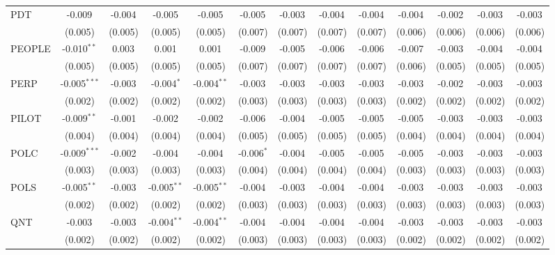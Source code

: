 \begin{table}[!htbp]
\begin{tabular}{@{\extracolsep{5pt}}lcccccccccccc}
 PDT & -0.009$^{}$ & -0.004$^{}$ & -0.005$^{}$ & -0.005$^{}$ & -0.005$^{}$ & -0.003$^{}$ & -0.004$^{}$ & -0.004$^{}$ & -0.004$^{}$ & -0.002$^{}$ & -0.003$^{}$ & -0.003$^{}$ \\
  & (0.005) & (0.005) & (0.005) & (0.005) & (0.007) & (0.007) & (0.007) & (0.007) & (0.006) & (0.006) & (0.006) & (0.006) \\
 PEOPLE & -0.010$^{**}$ & 0.003$^{}$ & 0.001$^{}$ & 0.001$^{}$ & -0.009$^{}$ & -0.005$^{}$ & -0.006$^{}$ & -0.006$^{}$ & -0.007$^{}$ & -0.003$^{}$ & -0.004$^{}$ & -0.004$^{}$ \\
  & (0.005) & (0.005) & (0.005) & (0.005) & (0.007) & (0.007) & (0.007) & (0.007) & (0.006) & (0.005) & (0.005) & (0.005) \\
 PERP & -0.005$^{***}$ & -0.003$^{}$ & -0.004$^{*}$ & -0.004$^{**}$ & -0.003$^{}$ & -0.003$^{}$ & -0.003$^{}$ & -0.003$^{}$ & -0.003$^{}$ & -0.002$^{}$ & -0.003$^{}$ & -0.003$^{}$ \\
  & (0.002) & (0.002) & (0.002) & (0.002) & (0.003) & (0.003) & (0.003) & (0.003) & (0.002) & (0.002) & (0.002) & (0.002) \\
 PILOT & -0.009$^{**}$ & -0.001$^{}$ & -0.002$^{}$ & -0.002$^{}$ & -0.006$^{}$ & -0.004$^{}$ & -0.005$^{}$ & -0.005$^{}$ & -0.005$^{}$ & -0.003$^{}$ & -0.003$^{}$ & -0.003$^{}$ \\
  & (0.004) & (0.004) & (0.004) & (0.004) & (0.005) & (0.005) & (0.005) & (0.005) & (0.004) & (0.004) & (0.004) & (0.004) \\
 POLC & -0.009$^{***}$ & -0.002$^{}$ & -0.004$^{}$ & -0.004$^{}$ & -0.006$^{*}$ & -0.004$^{}$ & -0.005$^{}$ & -0.005$^{}$ & -0.005$^{}$ & -0.003$^{}$ & -0.003$^{}$ & -0.003$^{}$ \\
  & (0.003) & (0.003) & (0.003) & (0.003) & (0.004) & (0.004) & (0.004) & (0.004) & (0.003) & (0.003) & (0.003) & (0.003) \\
 POLS & -0.005$^{**}$ & -0.003$^{}$ & -0.005$^{**}$ & -0.005$^{**}$ & -0.004$^{}$ & -0.003$^{}$ & -0.004$^{}$ & -0.004$^{}$ & -0.003$^{}$ & -0.003$^{}$ & -0.003$^{}$ & -0.003$^{}$ \\
  & (0.002) & (0.002) & (0.002) & (0.002) & (0.003) & (0.003) & (0.003) & (0.003) & (0.003) & (0.003) & (0.003) & (0.003) \\
 QNT & -0.003$^{}$ & -0.003$^{}$ & -0.004$^{**}$ & -0.004$^{**}$ & -0.004$^{}$ & -0.004$^{}$ & -0.004$^{}$ & -0.004$^{}$ & -0.003$^{}$ & -0.003$^{}$ & -0.003$^{}$ & -0.003$^{}$ \\
  & (0.002) & (0.002) & (0.002) & (0.002) & (0.003) & (0.003) & (0.003) & (0.003) & (0.002) & (0.002) & (0.002) & (0.002) \\

\end{tabular}
\end{table}
